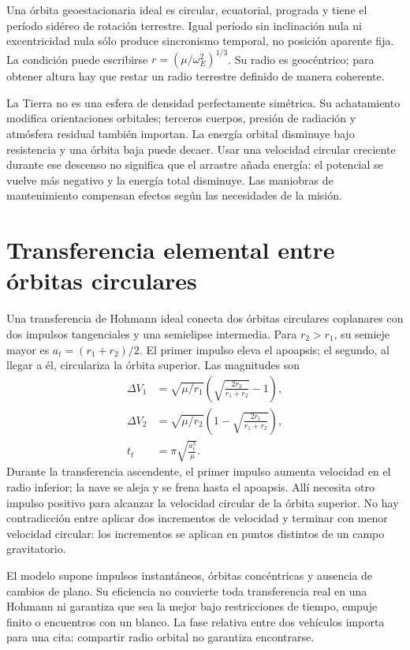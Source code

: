Una órbita geoestacionaria ideal es circular, ecuatorial, prograda y tiene el período sidéreo de rotación terrestre. Igual período sin inclinación nula ni excentricidad nula sólo produce sincronismo temporal, no posición aparente fija. La condición puede escribirse $r=(\mu/\omega_E^2)^{1/3}$. Su radio es geocéntrico; para obtener altura hay que restar un radio terrestre definido de manera coherente.

La Tierra no es una esfera de densidad perfectamente simétrica. Su achatamiento modifica orientaciones orbitales; terceros cuerpos, presión de radiación y atmósfera residual también importan. La energía orbital disminuye bajo resistencia y una órbita baja puede decaer. Usar una velocidad circular creciente durante ese descenso no significa que el arrastre añada energía: el potencial se vuelve más negativo y la energía total disminuye. Las maniobras de mantenimiento compensan efectos según las necesidades de la misión.

\section{Transferencia elemental entre órbitas circulares}
Una transferencia de Hohmann ideal conecta dos órbitas circulares coplanares con dos impulsos tangenciales y una semielipse intermedia. Para $r_2>r_1$, su semieje mayor es $a_t=(r_1+r_2)/2$. El primer impulso eleva el apoapsis; el segundo, al llegar a él, circulariza la órbita superior. Las magnitudes son
\begin{align}
\Delta V_1&=\sqrt{\mu/r_1}\left(\sqrt{\frac{2r_2}{r_1+r_2}}-1\right),\\
\Delta V_2&=\sqrt{\mu/r_2}\left(1-\sqrt{\frac{2r_1}{r_1+r_2}}\right),\\
t_t&=\pi\sqrt{\frac{a_t^3}{\mu}}.
\end{align}
Durante la transferencia ascendente, el primer impulso aumenta velocidad en el radio inferior; la nave se aleja y se frena hasta el apoapsis. Allí necesita otro impulso positivo para alcanzar la velocidad circular de la órbita superior. No hay contradicción entre aplicar dos incrementos de velocidad y terminar con menor velocidad circular: los incrementos se aplican en puntos distintos de un campo gravitatorio.

El modelo supone impulsos instantáneos, órbitas concéntricas y ausencia de cambios de plano. Su eficiencia no convierte toda transferencia real en una Hohmann ni garantiza que sea la mejor bajo restricciones de tiempo, empuje finito o encuentros con un blanco. La fase relativa entre dos vehículos importa para una cita: compartir radio orbital no garantiza encontrarse.

